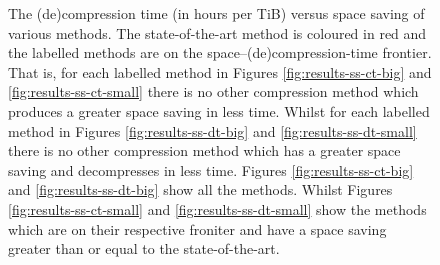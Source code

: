 \begin{figure}
{}
	\caption[The (de)compression time (in hours per TiB)
	versus space saving of various methods.]{\label{fig:results-ss-t}The (de)compression time (in hours per TiB)
	versus space saving of various methods. The state-of-the-art method is
	coloured in red and the labelled methods are on the
	space--(de)compression-time frontier. That is, for each labelled method
	in Figures \ref{fig:results-ss-ct-big} and
	\ref{fig:results-ss-ct-small}
	there is no other compression method which produces a greater space
	saving in less time. Whilst for each labelled method in Figures
	\ref{fig:results-ss-dt-big} and \ref{fig:results-ss-dt-small} there is
	no other compression method which has a greater space saving and
	decompresses in less time.
	Figures \ref{fig:results-ss-ct-big} and \ref{fig:results-ss-dt-big} show all the
	methods. Whilst Figures \ref{fig:results-ss-ct-small} and
	\ref{fig:results-ss-dt-small} show the methods which are on their
	respective froniter and have a space saving greater than or equal to the
	state-of-the-art.}
\end{figure}
